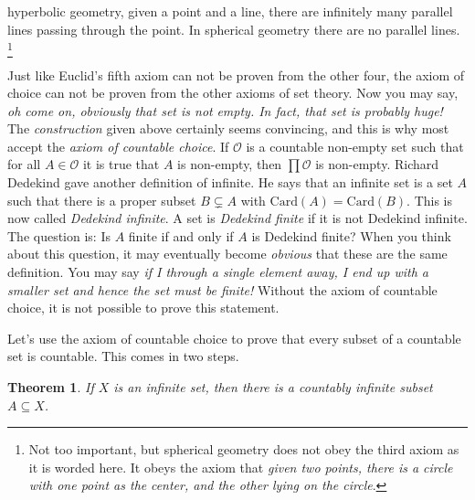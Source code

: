\documentclass{article}
\theoremstyle{plain}
\newtheorem{theorem}{Theorem}[section]
\theoremstyle{normal}
\newenvironment{axiom}{%
    \pushQED{\qed}\renewcommand{\qedsymbol}{$\blacksquare$}\axiomx%
}{%
    \popQED\endaxiomx%
}
\begin{document}
        hyperbolic geometry, given a point and a line, there are infinitely
        many parallel lines passing through the point. In spherical geometry
        there are no parallel lines.%
        \footnote{%
            Not too important, but spherical geometry does not obey the third
            axiom as it is worded here. It obeys the axiom that
            \textit{given two points, there is a circle with one point as the}
            \textit{center, and the other lying on the circle}.
        }
        \par\hfill\par
        Just like Euclid's fifth axiom can not be proven from the other four,
        the axiom of choice can not be proven from the other axioms of set
        theory. Now you may say, \textit{oh come on, obviously that set is not}
        \textit{empty. In fact, that set is probably huge!} The
        \textit{construction} given above certainly seems convincing, and this
        is why most accept the \textit{axiom of countable choice}.
        \begin{axiom}[\textbf{Axiom of Countable Choice}]
            If $\mathcal{O}$ is a countable non-empty set such that for all
            $A\in\mathcal{O}$ it is true that $A$ is non-empty, then
            $\prod\mathcal{O}$ is non-empty. 
        \end{axiom}
        Richard Dedekind gave another definition of infinite. He says that
        an infinite set is a set $A$ such that there is a proper subset
        $B\subsetneq{A}$ with $\textrm{Card}(A)=\textrm{Card}(B)$. This is
        now called \textit{Dedekind infinite}. A set is
        \textit{Dedekind finite} if it is not Dedekind infinite. The question
        is: Is $A$ finite if and only if $A$ is Dedekind finite? When you
        think about this question, it may eventually become
        \textit{obvious} that these are the same definition. You may say
        \textit{if I through a single element away, I end up with a smaller set}
        \textit{and hence the set must be finite!} Without the axiom of
        countable choice, it is not possible to prove this statement.
        \par\hfill\par
        Let's use the axiom of countable choice to prove that every subset
        of a countable set is countable. This comes in two steps.
        \begin{theorem}
            If $X$ is an infinite set, then there is a countably infinite subset
            $A\subseteq{X}$.
        \end{theorem}
\end{document}
